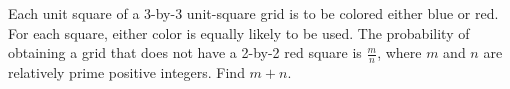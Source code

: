 Each unit square of a 3-by-3 unit-square grid is to be colored either blue or red. For each square, either color is equally likely to be used. The probability of obtaining a grid that does not have a 2-by-2 red square is $\frac{m}{n}$, where $m$ and $n$ are relatively prime positive integers. Find $m+n$.